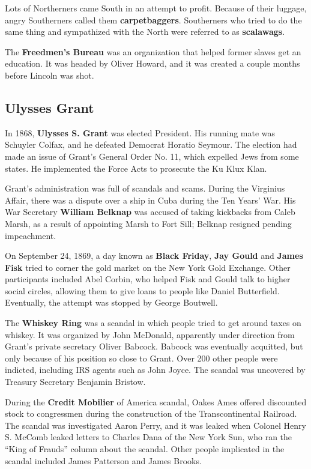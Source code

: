 Lots of Northerners came South in an attempt to profit.
Because of their luggage, angry Southerners called them \textbf{carpetbaggers}.
Southerners who tried to do the same thing and sympathized with the North were referred to as \textbf{scalawags}.

The \textbf{Freedmen's Bureau} was an organization that helped former slaves get an education.
It was headed by Oliver Howard, and it was created a couple months before Lincoln was shot.

\subsection*{Ulysses Grant}

In 1868, \textbf{Ulysses S. Grant} was elected President.
His running mate was Schuyler Colfax, and he defeated Democrat Horatio Seymour.
The election had made an issue of Grant's General Order No. 11, which expelled Jews from some states.
He implemented the Force Acts to prosecute the Ku Klux Klan.

Grant's administration was full of scandals and scams.
During the Virginius Affair, there was a dispute over a ship in Cuba during the Ten Years' War.
His War Secretary \textbf{William Belknap} was accused of taking kickbacks from Caleb Marsh,
as a result of appointing Marsh to Fort Sill;
Belknap resigned pending impeachment.

On September 24, 1869, a day known as \textbf{Black Friday},
\textbf{Jay Gould} and \textbf{James Fisk} tried to corner the gold market on the New York Gold Exchange.
Other participants included Abel Corbin, who helped Fisk and Gould talk to higher social circles,
allowing them to give loans to people like Daniel Butterfield.
Eventually, the attempt was stopped by George Boutwell.

The \textbf{Whiskey Ring} was a scandal in which people tried to get around taxes on whiskey.
It was organized by John McDonald, apparently under direction from Grant's private secretary Oliver Babcock.
Babcock was eventually acquitted, but only because of his position so close to Grant.
Over 200 other people were indicted, including IRS agents such as John Joyce.
The scandal was uncovered by Treasury Secretary Benjamin Bristow.

During the \textbf{Credit Mobilier} of America scandal,
Oakes Ames offered discounted stock to congressmen during the construction of the Transcontinental Railroad.
The scandal was investigated Aaron Perry,
and it was leaked when Colonel Henry S. McComb leaked letters to Charles Dana of the New York Sun,
who ran the ``King of Frauds'' column about the scandal.
Other people implicated in the scandal included James Patterson and James Brooks.

